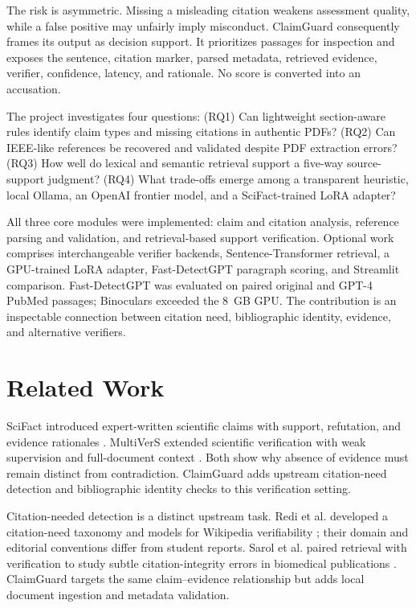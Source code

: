 \documentclass[12pt,toc=bib,toc=listof]{scrartcl}
\begin{document}
The risk is asymmetric. Missing a misleading citation weakens assessment quality, while a false positive may unfairly imply misconduct. ClaimGuard consequently frames its output as decision support. It prioritizes passages for inspection and exposes the sentence, citation marker, parsed metadata, retrieved evidence, verifier, confidence, latency, and rationale. No score is converted into an accusation.

The project investigates four questions: (RQ1) Can lightweight section-aware rules identify claim types and missing citations in authentic PDFs? (RQ2) Can IEEE-like references be recovered and validated despite PDF extraction errors? (RQ3) How well do lexical and semantic retrieval support a five-way source-support judgment? (RQ4) What trade-offs emerge among a transparent heuristic, local Ollama, an OpenAI frontier model, and a SciFact-trained LoRA adapter?

All three core modules were implemented: claim and citation analysis, reference parsing and validation, and retrieval-based support verification. Optional work comprises interchangeable verifier backends, Sentence-Transformer retrieval, a GPU-trained LoRA adapter, Fast-DetectGPT paragraph scoring, and Streamlit comparison. Fast-DetectGPT was evaluated on paired original and GPT-4 PubMed passages; Binoculars exceeded the 8~GB GPU. The contribution is an inspectable connection between citation need, bibliographic identity, evidence, and alternative verifiers.

\section{Related Work}

SciFact introduced expert-written scientific claims with support, refutation, and evidence rationales \cite{wadden2020}. MultiVerS extended scientific verification with weak supervision and full-document context \cite{wadden2022}. Both show why absence of evidence must remain distinct from contradiction. ClaimGuard adds upstream citation-need detection and bibliographic identity checks to this verification setting.

Citation-needed detection is a distinct upstream task. Redi et al. developed a citation-need taxonomy and models for Wikipedia verifiability \cite{redi2019}; their domain and editorial conventions differ from student reports. Sarol et al. paired retrieval with verification to study subtle citation-integrity errors in biomedical publications \cite{sarol2024}. ClaimGuard targets the same claim--evidence relationship but adds local document ingestion and metadata validation.
\end{document}

